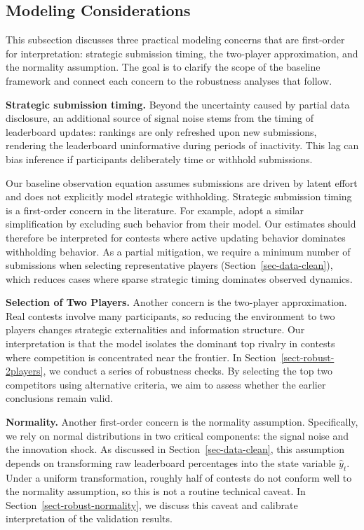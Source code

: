 \documentclass[mnsc]{informs3}
\begin{document}
\subsection{Modeling Considerations}\label{sect-conserns}

This subsection discusses three practical modeling concerns that are first-order for interpretation: strategic submission timing, the two-player approximation, and the normality assumption.
The goal is to clarify the scope of the baseline framework and connect each concern to the robustness analyses that follow.

\textbf{Strategic submission timing.}
Beyond the uncertainty caused by partial data disclosure, an additional source of signal noise stems from the timing of leaderboard updates: rankings are only refreshed upon new submissions, rendering the leaderboard uninformative during periods of inactivity.
This lag can bias inference if participants deliberately time or withhold submissions.


Our baseline observation equation assumes submissions are driven by latent effort and does not explicitly model strategic withholding.
Strategic submission timing is a first-order concern in the literature.
For example, \citet{lemus2021dynamic} adopt a similar simplification by excluding such behavior from their model.
Our estimates should therefore be interpreted for contests where active updating behavior dominates withholding behavior.
As a partial mitigation, we require a minimum number of submissions when selecting representative players (Section~\ref{sec-data-clean}), which reduces cases where sparse strategic timing dominates observed dynamics.


\textbf{Selection of Two Players.}
Another concern is the two-player approximation.
Real contests involve many participants, so reducing the environment to two players changes strategic externalities and information structure.
Our interpretation is that the model isolates the dominant top rivalry in contests where competition is concentrated near the frontier.
In Section~\ref{sect-robust-2players}, we conduct a series of robustness checks.
By selecting the top two competitors using alternative criteria, we aim to assess whether the earlier conclusions remain valid.

\textbf{Normality.}
Another first-order concern is the normality assumption.
Specifically, we rely on normal distributions in two critical components: the signal noise and the innovation shock.
As discussed in Section~\ref{sec-data-clean}, this assumption depends on transforming raw leaderboard percentages into the state variable $\hat{y}_t$.
Under a uniform transformation, roughly half of contests do not conform well to the normality assumption, so this is not a routine technical caveat.
In Section~\ref{sect-robust-normality}, we discuss this caveat and calibrate interpretation of the validation results.
\end{document}
